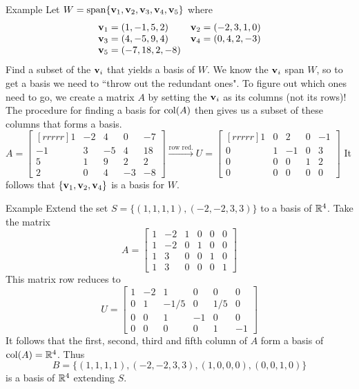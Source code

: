 \begin{frame}{Example}
\footnotesize
Let $W=\operatorname{span}\{{\mathbf v}_1,{\mathbf v}_2, {\mathbf v}_3, {\mathbf v}_4, {\mathbf v}_5\}$ where 
\[
\begin{array}{ll}
{\mathbf v}_1=(1,-1,5,2)&{\mathbf v}_2=(-2,3,1,0)\\
{\mathbf v}_3=(4,-5,9,4)&{\mathbf v}_4=(0,4,2,-3)\\
{\mathbf v}_5=(-7,18,2,-8)
\end{array}
\]
Find a subset of the ${\mathbf v}_i$ that yields a basis of $W$. 
\bpause 
We know the ${\mathbf v}_i$ span $W$, so to get a basis we need to ``throw out the redundant ones". To figure out which ones need to go, we create a matrix $A$ by setting the ${\mathbf v}_i$ as  its \alert{columns} (not its rows)! The procedure for finding a basis for $\operatorname{col}(A)$ then gives us a subset of these columns that forms a basis.
\bpause 
$A=\begin{bmatrix}[rrrrr]
1&-2&4&0&-7\\
-1&3&-5&4&18\\
5&1&9&2&2\\ 
2&0&4&-3&-8
\end{bmatrix}
\xrightarrow[]{\text{row red.}}
U=
\begin{bmatrix}[rrrrr]
\boxed{1}&0&2&0&-1\\
0&\boxed{1}&-1&0&3\\
0&0&0&\boxed{1}&2\\
0&0&0&0&0
\end{bmatrix}
$
\bpause
It follows that $\{{\mathbf v}_1,{\mathbf v}_2, {\mathbf v}_4\}$ is a basis for $W$. 
\end{frame}
\begin{frame}{Example}
Extend the set $S=\{ (1,1,1,1), (-2,-2,3,3)\}$ to a basis of ${\mathbb R}^4$. 
\bpause
Take the matrix 
\[
A=\begin{bmatrix}
1&-2&1&0&0&0\\
1&-2&0&1&0&0\\
1&3&0&0&1&0\\
1&3&0&0&0&1
\end{bmatrix}
\]
This matrix row reduces to 
\[
U=\begin{bmatrix}
\boxed{1}&-2&1&0&0&0\\
0&\boxed{1}&-1/5&0&1/5&0\\
0&0&\boxed{1}&-1&0&0\\
0&0&0&0&\boxed{1}&-1
\end{bmatrix}
\]
\pause
It follows that the first, second, third and fifth column of $A$ form a basis of $\operatorname{col}(A)={\mathbb R}^4$. Thus 
\[
B=\{(1,1,1,1), (-2,-2,3,3), (1,0,0,0), (0,0,1,0)\}
\]
is a basis of ${\mathbb R}^4$ extending $S$. 

\end{frame}
